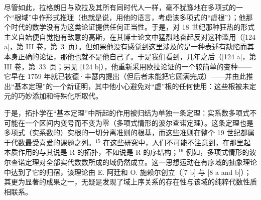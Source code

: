 尽管如此，拉格朗日与欧拉及其所有同时代人一样，毫不犹豫地在多项式的一个“根域”中作形式推理（也就是说，用他的语言，考虑该多项式的“虚根”）；他那个时代的数学没有为这类论证提供任何正当性。于是，对 18 世纪那种狂热的形式主义自始便自觉抱有敌意的高斯，在其博士论文中猛烈地奋起反对这种滥用（{[}124 a{]}，第 III 卷，第~3~页）。但如果他没有感觉到这里涉及的是一种表述有缺陷而其本身正确的论证，那他也就不是他自己了。于是我们看到，几年之后（{[}124 a{]}，第 III 卷，第~33~页；另见 {[}124 b{]}），他重新采用欧拉论证的一个较简单的变种——它早在 1759 年就已被德·丰瑟内提出（但后者未能把它圆满完成）——并由此推出“基本定理”的一个新证明，其中他小心避免对“虚”根的任何使用：这些根被未定元的巧妙添加和特殊化所取代。

于是，拓扑学在“基本定理”中所起的作用被归结为单独一条定理：实系数多项式不可能在一个区间内变号而不变为零（多项式情形的波尔查诺定理）。这条定理也是多项式（实系数的）实根的一切分离准则的根基，而这些准则在整个 19 世纪都属于代数最受喜爱的课题之列。\(^{15}\) 在这些研究中，人们不可能不注意到，在那里起本质作用的与其说是 R 的拓扑，不如说是 R 的序结构；\(^{16}\) 例如，多项式情形的波尔查诺定理对全部实代数数所成的域仍然成立。这一思想运动在有序域的抽象理论中达到了它的归宿，该理论由 E. 阿廷和 O. 施赖尔创立（{[}7 b{]} 与 {[}8 a and b{]}）；其更为显著的成果之一，无疑是发现了域上序关系的存在性与该域的纯粹代数性质相联系。
\relax{}
